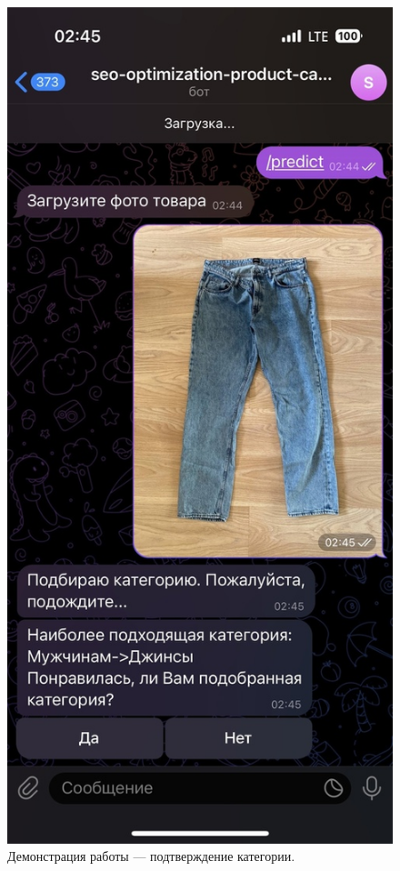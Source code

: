 \documentclass[a4paper,12pt]{extarticle}
\begin{document}
\begin{figure}[ht]
	\begin{minipage}[b]{3in}
		\centering
		\includegraphics[scale=0.35]{telegram-jeans-menu.png}
		\caption{Демонстрация работы — подтверждение категории.}

\end{minipage}
\end{figure}
\end{document}
